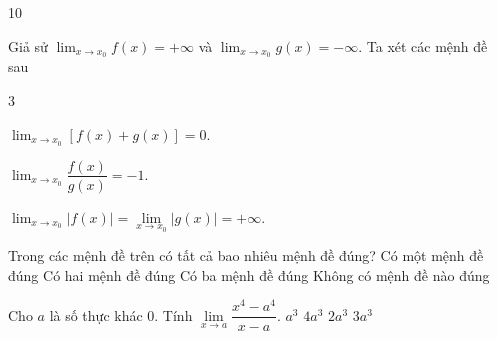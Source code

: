 \begin{indapan}{10}
\begin{ex}%
	Giả sử $\displaystyle \lim_{x \rightarrow x_0} f(x) = +\infty$ và $\displaystyle \lim_{x \rightarrow x_0} g(x) = -\infty$. Ta xét các mệnh đề sau
	\begin{enumEX}[(1)]{3}
		\item $\displaystyle \lim_{x \rightarrow x_0} \left[f(x) + g(x)\right]  = 0$.
		\item $\displaystyle \lim_{x \rightarrow x_0} \dfrac{f(x)}{g(x)}  = -1$.
		\item $\displaystyle \lim_{x \rightarrow x_0} \left|f(x)\right|  = \lim\limits_{x\rightarrow x_0} \left|g(x)\right| = +\infty$.
	\end{enumEX}
	Trong các mệnh đề trên có tất cả bao nhiêu mệnh đề đúng?
	\choice
	{Có một mệnh đề đúng}
	{Có hai mệnh đề đúng}
	{Có ba mệnh đề đúng}
	{\True Không có mệnh đề nào đúng}
\end{ex}


\begin{ex}%
	Cho $a$ là số thực khác $0$. Tính $\lim\limits_{ x\to a} \dfrac{x^4 -a^4}{x-a}$.
	\choice
	{$a^3$}
	{\True $4a^3$}
	{$2a^3$}
	{$3a^3$}
\end{ex}


\end{indapan}
